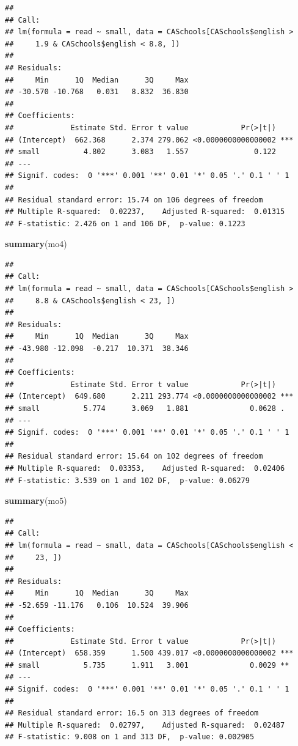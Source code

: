 \documentclass[
]{book}
\newenvironment{Shaded}{\begin{snugshade}}{\end{snugshade}}
\newcommand{\KeywordTok}[1]{\textcolor[rgb]{0.13,0.29,0.53}{\textbf{#1}}}
\newcommand{\NormalTok}[1]{#1}
\begin{document}
\begin{verbatim}
## 
## Call:
## lm(formula = read ~ small, data = CASchools[CASchools$english > 
##     1.9 & CASchools$english < 8.8, ])
## 
## Residuals:
##     Min      1Q  Median      3Q     Max 
## -30.570 -10.768   0.031   8.832  36.830 
## 
## Coefficients:
##             Estimate Std. Error t value            Pr(>|t|)    
## (Intercept)  662.368      2.374 279.062 <0.0000000000000002 ***
## small          4.802      3.083   1.557               0.122    
## ---
## Signif. codes:  0 '***' 0.001 '**' 0.01 '*' 0.05 '.' 0.1 ' ' 1
## 
## Residual standard error: 15.74 on 106 degrees of freedom
## Multiple R-squared:  0.02237,    Adjusted R-squared:  0.01315 
## F-statistic: 2.426 on 1 and 106 DF,  p-value: 0.1223
\end{verbatim}

\begin{Shaded}
\begin{Highlighting}[]
\KeywordTok{summary}\NormalTok{(mo4)}
\end{Highlighting}
\end{Shaded}

\begin{verbatim}
## 
## Call:
## lm(formula = read ~ small, data = CASchools[CASchools$english > 
##     8.8 & CASchools$english < 23, ])
## 
## Residuals:
##     Min      1Q  Median      3Q     Max 
## -43.980 -12.098  -0.217  10.371  38.346 
## 
## Coefficients:
##             Estimate Std. Error t value            Pr(>|t|)    
## (Intercept)  649.680      2.211 293.774 <0.0000000000000002 ***
## small          5.774      3.069   1.881              0.0628 .  
## ---
## Signif. codes:  0 '***' 0.001 '**' 0.01 '*' 0.05 '.' 0.1 ' ' 1
## 
## Residual standard error: 15.64 on 102 degrees of freedom
## Multiple R-squared:  0.03353,    Adjusted R-squared:  0.02406 
## F-statistic: 3.539 on 1 and 102 DF,  p-value: 0.06279
\end{verbatim}

\begin{Shaded}
\begin{Highlighting}[]
\KeywordTok{summary}\NormalTok{(mo5)}
\end{Highlighting}
\end{Shaded}

\begin{verbatim}
## 
## Call:
## lm(formula = read ~ small, data = CASchools[CASchools$english < 
##     23, ])
## 
## Residuals:
##     Min      1Q  Median      3Q     Max 
## -52.659 -11.176   0.106  10.524  39.906 
## 
## Coefficients:
##             Estimate Std. Error t value            Pr(>|t|)    
## (Intercept)  658.359      1.500 439.017 <0.0000000000000002 ***
## small          5.735      1.911   3.001              0.0029 ** 
## ---
## Signif. codes:  0 '***' 0.001 '**' 0.01 '*' 0.05 '.' 0.1 ' ' 1
## 
## Residual standard error: 16.5 on 313 degrees of freedom
## Multiple R-squared:  0.02797,    Adjusted R-squared:  0.02487 
## F-statistic: 9.008 on 1 and 313 DF,  p-value: 0.002905
\end{verbatim}
\end{document}
